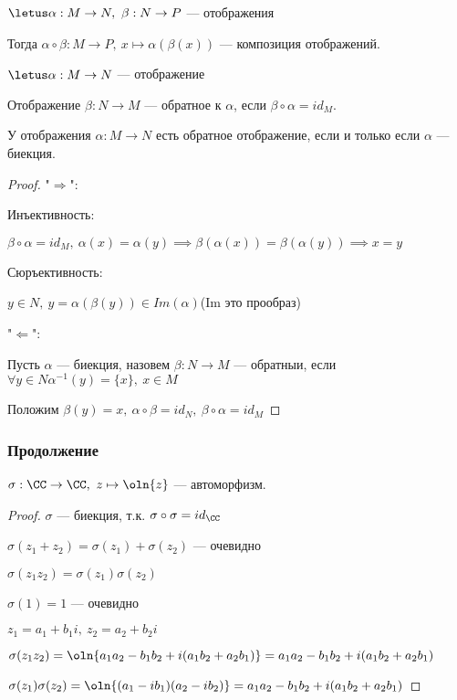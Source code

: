 \begin{defn}
    $\letus \alpha: M \to N,~\beta: N \to P$ --- отображения
    
    Тогда $\alpha \circ \beta: M \to P,~x \mapsto \alpha(\beta(x))$ --- композиция отображений.
\end{defn}

\begin{defn}
    $\letus \alpha: M \to N$ --- отображение

    Отображение $\beta: N \to M$ --- обратное к $\alpha$, если $\beta \circ \alpha = id_M$.
\end{defn}

\begin{theorem-non}
    У отображения $\alpha: M \to N$ есть обратное отображение, если и только если $\alpha$ --- биекция.
\end{theorem-non}


\begin{proof}
    
    "$\Rightarrow$":
    
    Инъективность:
    
    $\beta \circ \alpha = id_M,~\alpha(x) = \alpha(y) \implies \beta(\alpha(x)) = \beta(\alpha(y)) \implies x = y$
    
    Сюръективность:
    
    $y \in N,~y = \alpha(\beta(y)) \in Im(\alpha)$(Im это прообраз)
    
    "$\Leftarrow$":
    
    Пусть $\alpha$ --- биекция, назовем $\beta: N \to M$ --- обратныи, если $\forall y \in N \alpha^{-1}(y) = \{x\},~x \in M$
    
    Положим $\beta(y) = x,~\alpha \circ \beta = id_N,~\beta \circ \alpha = id_M$
\end{proof}

\subsubsection*{Продолжение}

\begin{theorem-non}
    $\sigma: \CC \to \CC,~z \mapsto \oln{z}$ --- автоморфизм.
\end{theorem-non}

\begin{proof}
    
    $\sigma$ --- биекция, т.к. $\sigma \circ \sigma = id_{\CC}$
    
    $\sigma(z_1 + z_2) = \sigma(z_1) + \sigma(z_2)$ --- очевидно
    
    $\sigma(z_1 z_2) = \sigma(z_1) \sigma(z_2)$
    
    $\sigma(1) = 1$ --- очевидно
    
    $z_1 = a_1 + b_1i,~z_2 = a_2 + b_2i$
    
    $\sigma(z_1 z_2) = \oln{a_1 a_2 - b_1 b_2 + i(a_1 b_2 + a_2 b_1)} = a_1 a_2 - b_1 b_2 + i(a_1 b_2 + a_2 b_1)$
    
    $\sigma(z_1) \sigma(z_2) = \oln{(a_1 - i b_1) (a_2 - i b_2)} = a_1 a_2 - b_1 b_2 + i(a_1 b_2 + a_2 b_1)$
\end{proof}